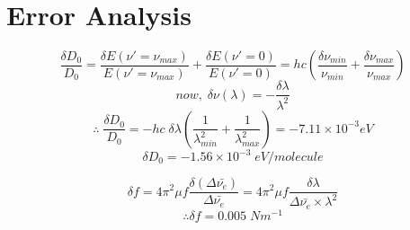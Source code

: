 \section{Error Analysis}

    $$\frac{\delta D_0}{D_0} = \frac{\delta E(\nu'=\nu_{max})}{E(\nu'=\nu_{max})} + \frac{\delta E(\nu'=0)}{E(\nu'=0)} = hc\left(\frac{\delta \nu_{min}}{\nu_{min}} + \frac{\delta \nu_{max}}{\nu_{max}}\right)$$
    $$now,\;\delta \nu (\lambda)= -\frac{\delta\lambda}{\lambda^2}$$
    $$\therefore\; \frac{\delta D_0}{D_0} = -hc\;\delta\lambda\left(\frac{1}{\lambda_{min}^2} + \frac{1}{\lambda_{max}^2}\right) = -7.11\times10^{-3}eV$$
    $$\delta D_0 = -1.56\times10^{-3}\;eV/molecule$$

    $$\delta f = 4\pi^2\mu f \frac{\delta (\Delta\bar{\nu_e})}{\Delta\bar{\nu_e}} = 4\pi^2\mu f \frac{\delta \lambda}{\Delta\bar{\nu_e}\times\lambda^2}$$
    $$\therefore \delta f=0.005\;N m^{-1}$$